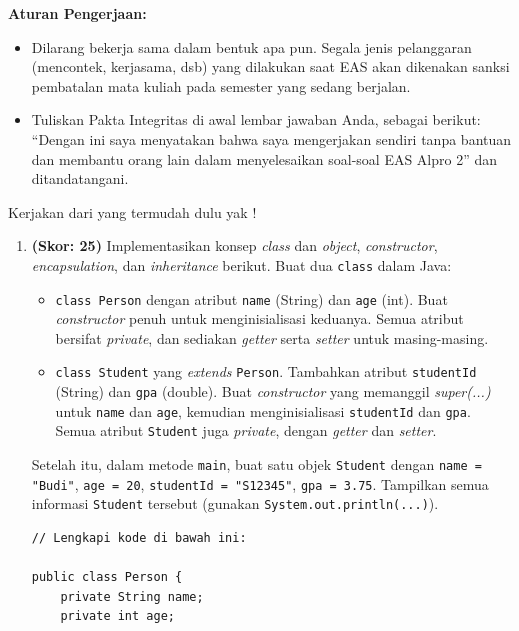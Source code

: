 \documentclass[10pt,openany,a4paper]{article}
\begin{document}
\indent
\textbf{Aturan Pengerjaan:}
\begin{itemize}
    \item Dilarang bekerja sama dalam bentuk apa pun. Segala jenis pelanggaran (mencontek, kerjasama, dsb) yang dilakukan saat EAS akan dikenakan sanksi pembatalan mata kuliah pada semester yang sedang berjalan.
    \item Tuliskan Pakta Integritas di awal lembar jawaban Anda, sebagai berikut: ``Dengan ini saya menyatakan bahwa saya mengerjakan sendiri tanpa bantuan dan membantu orang lain dalam menyelesaikan soal-soal EAS Alpro 2'' dan ditandatangani.
\end{itemize}

\noindent
Kerjakan dari yang termudah dulu yak !
\begin{enumerate}
    \item \textbf{(Skor: 25)}  
    Implementasikan konsep \textit{class} dan \textit{object}, \textit{constructor}, \textit{encapsulation}, dan \textit{inheritance} berikut.  
    Buat dua \texttt{class} dalam Java:
    \begin{itemize}
        \item \texttt{class Person} dengan atribut \texttt{name} (String) dan \texttt{age} (int). Buat \textit{constructor} penuh untuk menginisialisasi keduanya. Semua atribut bersifat \textit{private}, dan sediakan \textit{getter} serta \textit{setter} untuk masing-masing.
        \item \texttt{class Student} yang \textit{extends} \texttt{Person}. Tambahkan atribut \texttt{studentId} (String) dan \texttt{gpa} (double). Buat \textit{constructor} yang memanggil \textit{super(...)} untuk \texttt{name} dan \texttt{age}, kemudian menginisialisasi \texttt{studentId} dan \texttt{gpa}. Semua atribut \texttt{Student} juga \textit{private}, dengan \textit{getter} dan \textit{setter}.
    \end{itemize}
    \noindent
    Setelah itu, dalam metode \texttt{main}, buat satu objek \texttt{Student} dengan \texttt{name = "Budi"}, \texttt{age = 20}, \texttt{studentId = "S12345"}, \texttt{gpa = 3.75}. Tampilkan semua informasi \texttt{Student} tersebut (gunakan \texttt{System.out.println(...)}).
    
    \begin{verbatim}
// Lengkapi kode di bawah ini:

public class Person {
    private String name;
    private int age;


\end{verbatim}
\end{enumerate}
\end{document}
